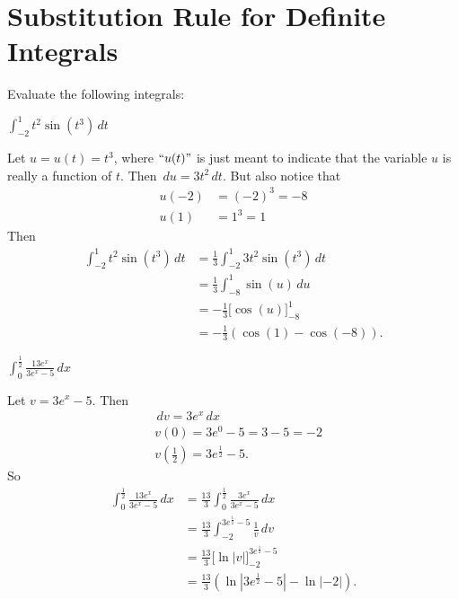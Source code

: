 \documentclass[handout, nooutcomes]{ximera}
\renewenvironment{freeResponse}{
\ifhandout\setbox0\vbox\bgroup\else
\begin{trivlist}\item[\hskip \labelsep\bfseries Solution:\hspace{2ex}]
\fi}
{\ifhandout\egroup\else
\end{trivlist}
\fi}
\renewcommand{\d}{\,d}
\newcommand{\eval}[1]{\bigg[ #1 \bigg]}
\begin{document}
\section{Substitution Rule for Definite Integrals}
\begin{problem}
Evaluate the following integrals:

	\begin{enumerate}

	\item  $\int_{-2}^1 t^2 \sin(t^3) \d t$
		\begin{freeResponse}
		Let $u=u(t) = t^3$, where $``u(t)"$ is just meant to indicate that the variable $u$ is really a function of $t$.  Then $\d u = 3t^2 \d t$.  But also notice that
			\begin{align*}
			u(-2) &= (-2)^3 = -8  \\
			u(1) &= 1^3 = 1
			\end{align*}
		Then
			\begin{align*}
			\int_{-2}^1 t^2 \sin(t^3) \d t &= \frac{1}{3} \int_{-2}^1 3 t^2 \sin(t^3) \d t  \\
			&= \frac{1}{3} \int_{-8}^1 \sin(u) \d u  \\
			&= - \frac{1}{3} \eval{\cos(u)}_{-8}^1  \\
			&= - \frac{1}{3} ( \cos(1) - \cos(-8)).
			\end{align*}
		\end{freeResponse}

	\item  $\int_0^{\frac{1}{2}} \frac{13e^x}{3e^x - 5} \d x$
		\begin{freeResponse}
		Let $v=3e^x - 5$.  Then
			\begin{align*}
			&\d v = 3e^x \d x  \\
			&v(0) = 3e^0 -5= 3-5=-2  \\
			&v\left( \frac{1}{2} \right) = 3e^{\frac{1}{2}} - 5.
			\end{align*}
		So
			\begin{align*}
			\int_0^{\frac{1}{2}} \frac{13e^x}{3e^x - 5} \d x &= \frac{13}{3} \int_0^{\frac{1}{2}} \frac{3e^x}{3e^x - 5} \d x  \\
			&= \frac{13}{3} \int_{-2}^{3e^{\frac{1}{2}}-5} \frac{1}{v} \d v  \\
			&= \frac{13}{3} \eval{\ln|v|}_{-2}^{3e^{\frac{1}{2}}-5}  \\
			&= \frac{13}{3} \left( \ln|3e^{\frac{1}{2}}-5| - \ln|-2| \right).  \\
			\end{align*}
		\end{freeResponse}
	\end{enumerate}
\end{problem}
\end{document}
